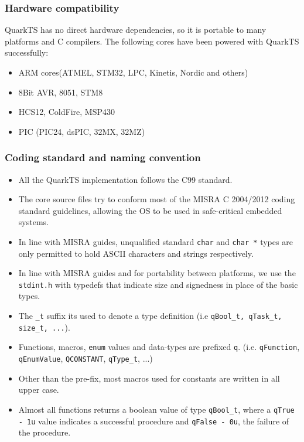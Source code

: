 \documentclass{article}
\begin{document}
\subsubsection{Hardware compatibility}
QuarkTS has no direct hardware dependencies, so it is portable to many platforms and C compilers. 
The following cores have been powered with QuarkTS successfully:
\begin{itemize}
    \item ARM cores(ATMEL, STM32, LPC, Kinetis, Nordic and others)
    \item 8Bit AVR, 8051, STM8
    \item HCS12, ColdFire, MSP430
    \item PIC (PIC24, dsPIC, 32MX, 32MZ)
\end{itemize}

\subsubsection{Coding standard and naming convention}

\begin{itemize}
    \item All the QuarkTS implementation follows the C99 standard.
    \item The core source files try to conform most of the MISRA C 2004/2012 coding standard guidelines, allowing the OS to be used in safe-critical embedded systems. 
    \item In line with MISRA guides, unqualified standard \lstinline{char} and \lstinline{char *} types are only permitted to hold ASCII characters and strings respectively.
    \item In line with MISRA guides and for portability between platforms, we use the \lstinline{stdint.h} with typedefs that indicate size and signedness in place of the basic types.
    \item The \lstinline{_t} suffix its used to denote a type definition (i.e \lstinline{qBool_t, qTask_t, size_t, ...}).   
    \item Functions, macros, \lstinline{enum} values and data-types are prefixed \lstinline{q}. (i.e. \lstinline{qFunction}, \lstinline{qEnumValue}, \lstinline{QCONSTANT}, \lstinline{qType_t}, ...)
    \item Other than the pre-fix, most macros used for constants are written in all upper case.
    \item Almost all functions returns a boolean value of type \lstinline{qBool_t}, where a \lstinline{qTrue - 1u}  value indicates a successful procedure and \lstinline{qFalse - 0u}, the failure of the procedure.
\end{itemize}
\end{document}
